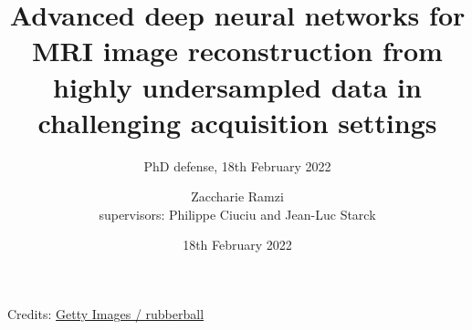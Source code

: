 \documentclass[aspectratio=169,xcolor=dvipsnames]{beamer}
\title[Advanced deep neural networks for MRI image reconstruction]{Advanced deep neural networks for MRI image reconstruction from highly undersampled data in challenging acquisition settings
} %
\subtitle{PhD defense, 18th February 2022}
\author[Zaccharie] {Zaccharie Ramzi \\  {\footnotesize supervisors: Philippe Ciuciu and Jean-Luc Starck}}
\institute[Inria-CEA] %
{
    Parietal team, Inria Saclay \\
    NeuroSpin and Cosmostat, CEA Saclay
}
\date{18th February 2022} %
\begin{document}
\begin{frame}
    \titlepage
\end{frame}

{
\begin{frame}[plain]
    \href{run:Sounds/mri_sounds.mp3}{\faPlayCircle}
    \begin{minipage}[t][.8\textheight]{\textwidth}
        \vfill

        \tiny
        Credits: \href{https://www.francetvinfo.fr/sante/malgre-l-augmentation-des-besoins-medicaux-le-deficit-en-france-d-appareils-irm-se-fait-de-plus-en-plus-sentir_220301.html}{Getty Images / rubberball}
      \end{minipage}
\end{frame}
}
\end{document}
